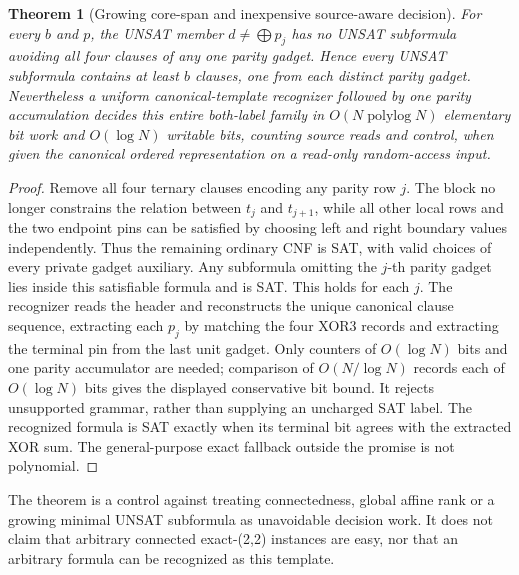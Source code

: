 \documentclass[11pt]{article}
\newtheorem{theorem}{Theorem}
\begin{document}
\begin{theorem}[Growing core-span and inexpensive source-aware decision]
For every $b$ and $p$, the UNSAT member $d\ne\bigoplus p_j$ has no UNSAT subformula avoiding all four clauses of any one parity gadget. Hence every UNSAT subformula contains at least $b$ clauses, one from each distinct parity gadget. Nevertheless a uniform canonical-template recognizer followed by one parity accumulation decides this entire both-label family in $O(N\operatorname{polylog}N)$ elementary bit work and $O(\log N)$ writable bits, counting source reads and control, when given the canonical ordered representation on a read-only random-access input.
\end{theorem}
\begin{proof}
Remove all four ternary clauses encoding any parity row $j$. The block no longer constrains the relation between $t_j$ and $t_{j+1}$, while all other local rows and the two endpoint pins can be satisfied by choosing left and right boundary values independently. Thus the remaining ordinary CNF is SAT, with valid choices of every private gadget auxiliary. Any subformula omitting the $j$-th parity gadget lies inside this satisfiable formula and is SAT. This holds for each $j$. The recognizer reads the header and reconstructs the unique canonical clause sequence, extracting each $p_j$ by matching the four XOR3 records and extracting the terminal pin from the last unit gadget. Only counters of $O(\log N)$ bits and one parity accumulator are needed; comparison of $O(N/\log N)$ records each of $O(\log N)$ bits gives the displayed conservative bit bound. It rejects unsupported grammar, rather than supplying an uncharged SAT label. The recognized formula is SAT exactly when its terminal bit agrees with the extracted XOR sum. The general-purpose exact fallback outside the promise is not polynomial.
\end{proof}
The theorem is a control against treating connectedness, global affine rank or a growing minimal UNSAT subformula as unavoidable decision work. It does not claim that arbitrary connected exact-(2,2) instances are easy, nor that an arbitrary formula can be recognized as this template.
\end{document}
